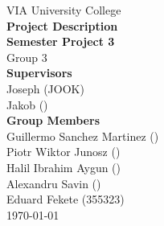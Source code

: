 \thispagestyle{empty}
\vspace*{0.15\textheight}
\begin{center}
    {\Large VIA University College}\\[2em]
    {\huge \textbf{Project Description}}\\[0.5em]
    {\Large \textbf{Semester Project 3}}\\[0.5em]
    {\Large Group 3}\\[3em]
    {\large \textbf{Supervisors}}\\[0.5em]
    {\large Joseph (JOOK)}\\[0.5em]
    {\large Jakob ()}\\[2em]
    {\large \textbf{Group Members}}\\[0.5em]
    {\large Guillermo Sanchez Martinez ()}\\[0.5em]
    {\large Piotr Wiktor Junosz ()}\\[0.5em]
    {\large Halil Ibrahim Aygun ()}\\[0.5em]
    {\large Alexandru Savin ()}\\[0.5em]
    {\large Eduard Fekete (355323)}\\[2em]
    {\large \today}
\end{center}
\vfill
\clearpage